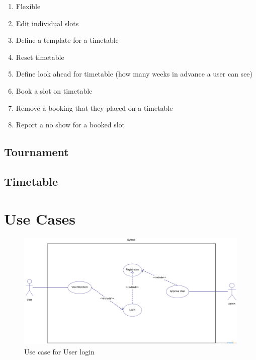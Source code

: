 \begin{enumerate}
\item Flexible 
\item Edit individual slots
\item Define a template for a timetable
\item Reset timetable
\item Define look ahead for timetable (how many weeks in advance a user can see)
\item Book a slot on timetable
\item Remove a booking that they placed on a timetable
\item Report a no show for a booked slot
\end{enumerate}

\subsection{Tournament}

\subsection{Timetable}

\section{Use Cases}

\begin{figure}[H]
\begin{center}
\includegraphics[width=14cm]{usecaselogin.png}
\end{center}
\caption{Use case for User login}
\label{fig:usecaselogin}
\end{figure}

